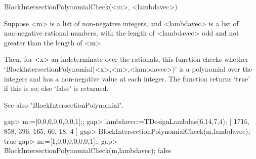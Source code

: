 \>BlockIntersectionPolynomialCheck(<m>, <lambdavec>)

Suppose <m> is a list of non-negative integers, and <lambdavec> is a
list of non-negative rational numbers, with the length of <lambdavec>
odd and not greater than the length of <m>.

Then, for <x> an indeterminate over the rationals, this function
checks whether `BlockIntersectionPolynomial(<x>,<m>,<lambdavec>)' is a
polynomial over the integers and has a non-negative value at each integer.
The function returns `true' if this is so; else `false' is returned.

See also "BlockIntersectionPolynomial".

\beginexample
gap> m:=[0,0,0,0,0,0,0,1];;
gap> lambdavec:=TDesignLambdas(6,14,7,4);
[ 1716, 858, 396, 165, 60, 18, 4 ]
gap> BlockIntersectionPolynomialCheck(m,lambdavec);
true
gap> m:=[1,0,0,0,0,0,0,1];;
gap> BlockIntersectionPolynomialCheck(m,lambdavec);
false
\endexample
